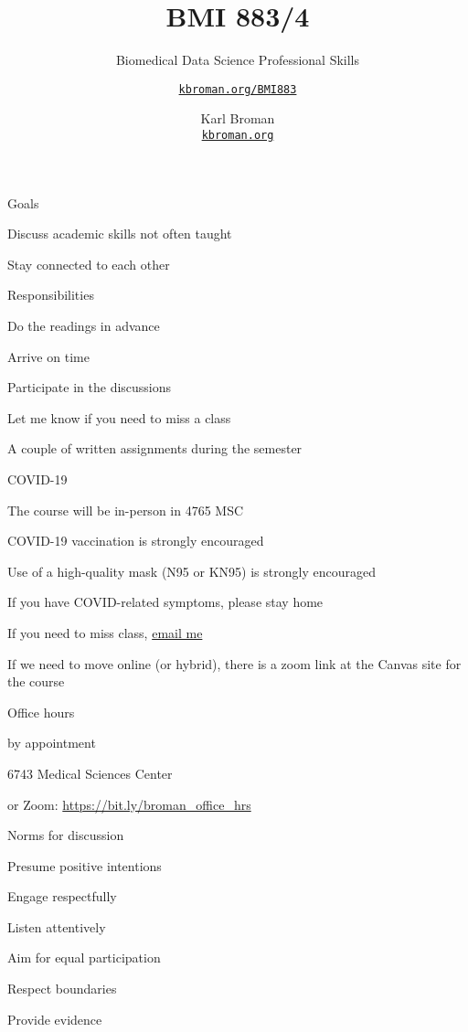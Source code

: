 \documentclass[aspectratio=169,12pt,t]{beamer}
\title{BMI 883/4}
\subtitle{Biomedical Data Science Professional Skills}
\author{\href{https://kbroman.org/BMI883}{\tt kbroman.org/BMI883} }
\institute{}
\date{\small \hspace{3in} Karl Broman \\
  \hspace{3in} \href{https://kbroman.org}{\color{foreground}
    \small \tt kbroman.org}}
\begin{document}
{
\frame{
  \titlepage
} }




\begin{frame}{Goals}

  \bbi
\item Discuss academic skills not often taught
\item Stay connected to each other
  \ei

\end{frame}




\begin{frame}{Responsibilities}

  \bbi
\item Do the readings in advance
\item Arrive on time
\item Participate in the discussions
\item Let me know if you need to miss a class
\item A couple of written assignments during the semester
  \ei

\end{frame}



\begin{frame}{COVID-19}

  \bbi
\item The course will be in-person in 4765 MSC
\item COVID-19 vaccination is strongly encouraged
\item Use of a high-quality mask (N95 or KN95) is strongly encouraged
\item If you have COVID-related symptoms, please stay home
\item If you need to miss class, \href{mailto:broman@wisc.edu}{email me}
\item If we need to move online (or hybrid), there is a zoom link at
  the Canvas site for the course
  \ei

\end{frame}




\begin{frame}{Office hours}

  \bbi
\item {\hilit by appointment}
\item 6743 Medical Sciences Center
\item or Zoom: \url{https://bit.ly/broman_office_hrs}
\ei

\end{frame}






\begin{frame}{Norms for discussion}

      \bbi
    \item Presume positive intentions
    \item Engage respectfully
    \item Listen attentively
    \item Aim for equal participation
    \item Respect boundaries
    \item Provide evidence
      \ei

\end{frame}
\end{document}
